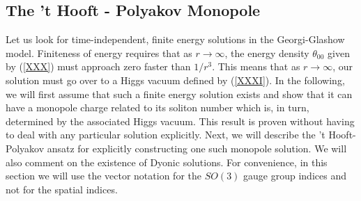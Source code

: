 \subsection{The 't Hooft - Polyakov Monopole}

Let us look for time-independent, finite energy solutions in the
Georgi-Glashow model. Finiteness of energy requires that as
$r\rightarrow \infty$, the energy density $\theta_{00}$ given by
(\ref{XXX}) must approach zero faster than $1/r^3$. This means that
as $r\rightarrow \infty$, our solution must go over to a Higgs vacuum
defined by (\ref{XXXI}).  In the following, we will first assume that
such a finite energy solution exists and show that it can have a
monopole charge related to its soliton number which is, in turn,
determined by the associated Higgs vacuum. This result is proven
without having to deal with any particular solution explicitly. Next,
we will describe the 't Hooft-Polyakov ansatz for explicitly
constructing one such monopole solution. We will also comment on the
existence of Dyonic solutions. For convenience, in this section we
will use the vector notation for the $SO(3)$ gauge group indices and
not for the spatial indices. 

